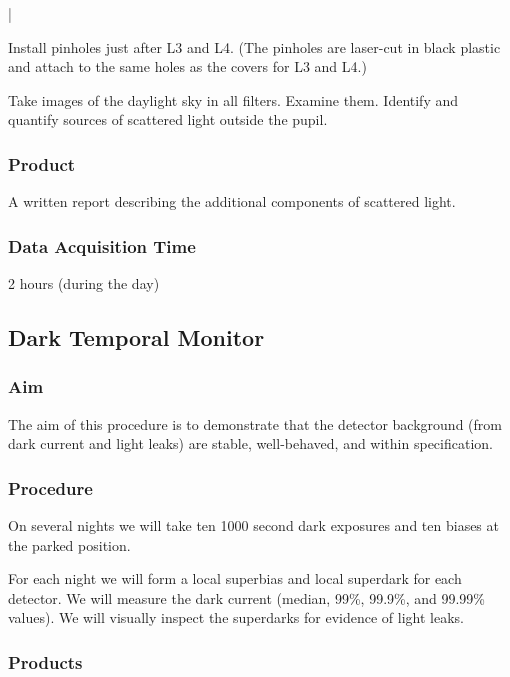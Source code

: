 |\documentclass{article}
\begin{document}
Install pinholes just after L3 and L4. (The pinholes are laser-cut in black plastic and attach to the same holes as the covers for L3 and L4.)

Take images of the daylight sky in all filters. Examine them. Identify and quantify sources of scattered light outside the pupil.

\subsubsection{Product}

A written report describing the additional components of scattered light.

\subsubsection{Data Acquisition Time}

2 hours (during the day)


\subsection{Dark Temporal Monitor}

\subsubsection{Aim}

The aim of this procedure is to demonstrate that the detector background (from dark current and light leaks) are stable, well-behaved, and within specification.

\subsubsection{Procedure}

On several nights we will take ten 1000 second dark exposures and ten biases at the parked position.

For each night we will form a local superbias and local superdark for each detector. We will measure the dark current (median, 99\%, 99.9\%, and 99.99\% values). We will visually inspect the superdarks for evidence of light leaks.

\subsubsection{Products}
\end{document}
